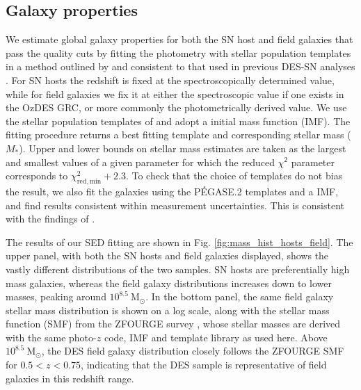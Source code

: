\documentclass[fleqn,usenatbib]{mnras}
\begin{document}
\subsection{Galaxy properties \label{subsec:properties}}

We estimate global galaxy properties for both the SN host and field galaxies that pass the quality cuts by fitting the photometry with stellar population templates in a method outlined by \citet{Sullivan2006} and consistent to that used in previous DES-SN analyses \citep{kelsey2021,Smith2020,Wiseman2020}. For SN hosts the redshift is fixed at the spectroscopically determined value, while for field galaxies we fix it at either the spectroscopic value if one exists in the OzDES GRC, or more commonly the photometrically derived value. We use the stellar population templates of \citet{Bruzual2003} and adopt a \citet{Chabrier2003} initial mass function (IMF). The fitting procedure returns a best fitting template and corresponding stellar mass ($M_*$). Upper and lower bounds on stellar mass estimates are taken as the largest and smallest values of a given parameter for which the reduced $\chi^2$ parameter corresponds to $\chi^2_{\mathrm{red, min}} +2.3$. To check that the choice of templates do not bias the result, we also fit the galaxies using the P\'EGASE.2 templates \citep{Fioc1997,LeBorgne2002} and a \citet{Kroupa2001} IMF, and find results consistent within measurement uncertainties. This is consistent with the findings of \citet{Smith2020}. 

The results of our SED fitting are shown in Fig. \ref{fig:mass_hist_hosts_field}. The upper panel, with both the SN hosts and field galaxies displayed, shows the vastly different distributions of the two samples. SN hosts are preferentially high mass galaxies, whereas the field galaxy distributions increases down to lower masses, peaking around $10^{8.5}~\mathrm{M}_{\odot}$. In the bottom panel, the same field galaxy stellar mass distribution is shown on a log scale, along with the stellar mass function (SMF) from the ZFOURGE survey \citep{Tomczak2014}, whose stellar masses are derived with the same photo-$z$ code, IMF and template library as used here. Above $10^{8.5}~\mathrm{M}_{\odot}$, the DES field galaxy distribution closely follows the ZFOURGE SMF for $0.5<z<0.75$, indicating that the DES sample is representative of field galaxies in this redshift range.%
\end{document}
